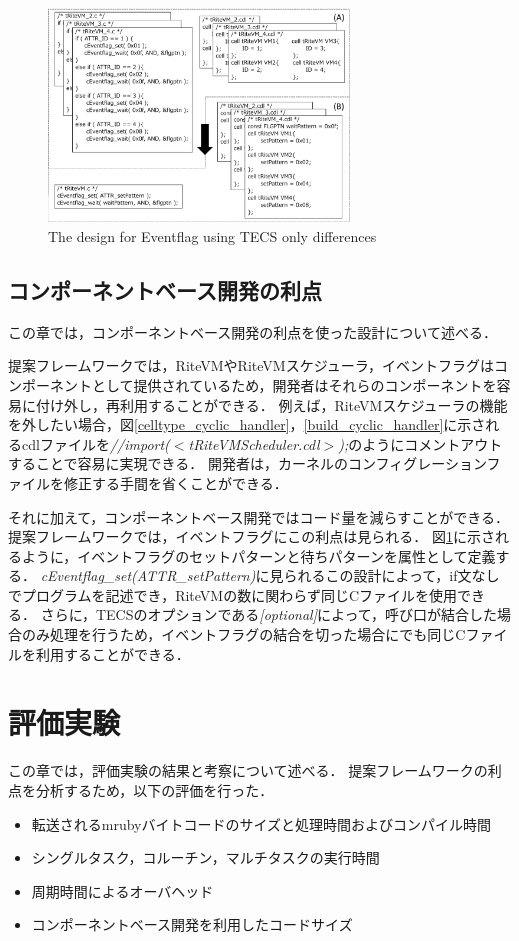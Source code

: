 \documentclass[submit]{ipsj_v2/UTF8/ipsj}
\begin{document}
\begin{figure}[t]
    \centering
    \includegraphics[width=8cm,clip]{../EMSOFT2016/figure/Eventflag.pdf}
    \caption{The design for Eventflag using TECS {\scriptsize *only differences}}
    \label{fig:Eventflag}
\end{figure}
 
\subsection{コンポーネントベース開発の利点}
この章では，コンポーネントベース開発の利点を使った設計について述べる．

提案フレームワークでは，RiteVMやRiteVMスケジューラ，イベントフラグはコンポーネントとして提供されているため，開発者はそれらのコンポーネントを容易に付け外し，再利用することができる．
例えば，RiteVMスケジューラの機能を外したい場合，図\ref{celltype_cyclic_handler}，\ref{build_cyclic_handler}に示されるcdlファイルを{\it //import($<$tRiteVMScheduler.cdl$>$);}のようにコメントアウトすることで容易に実現できる．
開発者は，カーネルのコンフィグレーションファイルを修正する手間を省くことができる．

それに加えて，コンポーネントベース開発ではコード量を減らすことができる．
提案フレームワークでは，イベントフラグにこの利点は見られる．
図\ref{fig:Eventflag}に示されるように，イベントフラグのセットパターンと待ちパターンを属性として定義する．
{\it cEventflag\_set(ATTR\_setPattern)}に見られるこの設計によって，if文なしでプログラムを記述でき，RiteVMの数に関わらず同じCファイルを使用できる．
さらに，TECSのオプションである{\it [optional]}によって，呼び口が結合した場合のみ処理を行うため，イベントフラグの結合を切った場合にでも同じCファイルを利用することができる．

\section{評価実験}
\label{sec:Evaluation}
この章では，評価実験の結果と考察について述べる．
提案フレームワークの利点を分析するため，以下の評価を行った．
\begin{itemize}
    \item 転送されるmrubyバイトコードのサイズと処理時間およびコンパイル時間
    \item シングルタスク，コルーチン，マルチタスクの実行時間
    \item 周期時間によるオーバヘッド
    \item コンポーネントベース開発を利用したコードサイズ 
\end{itemize}
\end{document}
